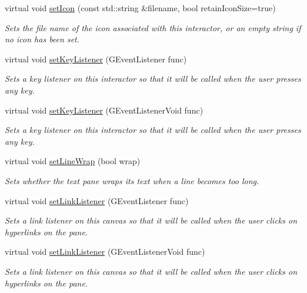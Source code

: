 \begin{DoxyCompactItemize}
virtual void \mbox{\hyperlink{classGInteractor_a762e139aa311461c3984d3ad28293f64}{set\+Icon}} (const std\+::string \&filename, bool retain\+Icon\+Size=true)
\begin{DoxyCompactList}\small\item\em Sets the file name of the icon associated with this interactor, or an empty string if no icon has been set. \end{DoxyCompactList}\item 
virtual void \mbox{\hyperlink{classGInteractor_aeb8324d3287fa1fbe093f4d6230cf0a6}{set\+Key\+Listener}} (G\+Event\+Listener func)
\begin{DoxyCompactList}\small\item\em Sets a key listener on this interactor so that it will be called when the user presses any key. \end{DoxyCompactList}\item 
virtual void \mbox{\hyperlink{classGInteractor_ae48ecea73606c7bd9423e1c7cc589cc9}{set\+Key\+Listener}} (G\+Event\+Listener\+Void func)
\begin{DoxyCompactList}\small\item\em Sets a key listener on this interactor so that it will be called when the user presses any key. \end{DoxyCompactList}\item 
virtual void \mbox{\hyperlink{classGBrowserPane_aaaafb06fec060b28b70ec3b7379657b4}{set\+Line\+Wrap}} (bool wrap)
\begin{DoxyCompactList}\small\item\em Sets whether the text pane wraps its text when a line becomes too long. \end{DoxyCompactList}\item 
virtual void \mbox{\hyperlink{classGBrowserPane_aaa849c4aed1fa43178314f5c76e43081}{set\+Link\+Listener}} (G\+Event\+Listener func)
\begin{DoxyCompactList}\small\item\em Sets a link listener on this canvas so that it will be called when the user clicks on hyperlinks on the pane. \end{DoxyCompactList}\item 
virtual void \mbox{\hyperlink{classGBrowserPane_aca745635b2c4ceb74587ca5cfc26f0c3}{set\+Link\+Listener}} (G\+Event\+Listener\+Void func)
\begin{DoxyCompactList}\small\item\em Sets a link listener on this canvas so that it will be called when the user clicks on hyperlinks on the pane. \end{DoxyCompactList}\item 

\end{DoxyCompactItemize}
